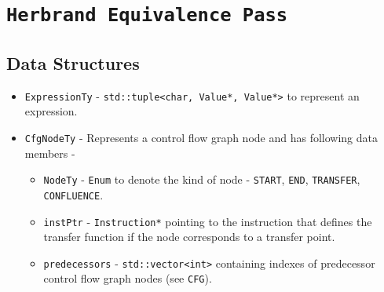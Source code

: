 \section{\texttt{Herbrand Equivalence Pass}}
\label{sec:HerbrandEquivalencePass}

\subsection{Data Structures}
\label{subsec:DataStructuresLLVM}
\begin{itemize} \tightlist
    \item \texttt{ExpressionTy} - \texttt{std::tuple<char, Value*, Value*>} to represent an expression.
    \item \texttt{CfgNodeTy} - Represents a control flow graph node and has following data members -
        \begin{itemize}
            \item \texttt{NodeTy} - \texttt{Enum} to denote the kind of node - \texttt{START}, \texttt{END}, \texttt{TRANSFER}, \texttt{CONFLUENCE}.
            \item \texttt{instPtr} - \texttt{Instruction*} pointing to the instruction that defines the transfer function if the node corresponds to a transfer point.
            \item \texttt{predecessors} - \texttt{std::vector<int>} containing indexes of predecessor control flow graph nodes (see \texttt{CFG}).
        \end{itemize}
\end{itemize}

